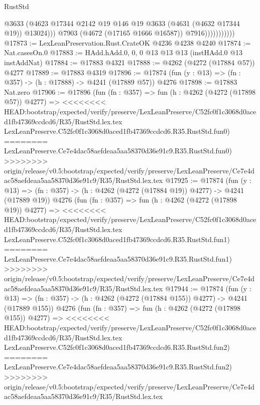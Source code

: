 \begin{lexlean}{RustStd}
\begin{coremodule}
{\begin{coremodule}
{{{{{{{{{{{{{{{{                              @3633
                              (@4623
                                @17344
                                @2142
                                @19
                                @146
                                @19
                                @3633
                                (@4631 (@4632 @17344 @19))
                                @13024)))
                          @7903
                          (@4672 (@17165 @1666 @16587))
                          @7916)))))))))))
@17873 := LexLeanPreservation.Rust.CrateOK @4236 @4238 @4240
@17874 := Nat.casesOn.{0}
@17883 := HAdd.hAdd.{0, 0, 0} @13 @13 @13 (instHAdd.{0} @13 instAddNat)
@17884 := @17883 @4321
@17888 := @4262 (@4272 (@17884 @57)) @4277
@17889 := @17883 @4319
@17896 := @17874 (fun (y : @13) => (fn : @357) -> (h : @17888) -> @4241 (@17889 @57)) @4276
@17898 := @17883 Nat.zero
@17906 := @17896
    (fun (fn : @357) =>
    fun (h : @4262 (@4272 (@17898 @57)) @4277) =>
<<<<<<<< HEAD:bootstrap/expected/verify/preserve/LexLeanPreserve/C52fc0f1c3068d0aced1fb47369ccdcd6/R35/RustStd.lex.tex
    LexLeanPreserve.C52fc0f1c3068d0aced1fb47369ccdcd6.R35.RustStd.fun0)
========
    LexLeanPreserve.Ce7e4dac58aefdeaa5aa58370d36e91c9.R35.RustStd.fun0)
>>>>>>>> origin/release/v0.5:bootstrap/expected/verify/preserve/LexLeanPreserve/Ce7e4dac58aefdeaa5aa58370d36e91c9/R35/RustStd.lex.tex
@17925 := @17874
    (fun (y : @13) => (fn : @357) -> (h : @4262 (@4272 (@17884 @19)) @4277) -> @4241 (@17889 @19))
    @4276
    (fun (fn : @357) =>
    fun (h : @4262 (@4272 (@17898 @19)) @4277) =>
<<<<<<<< HEAD:bootstrap/expected/verify/preserve/LexLeanPreserve/C52fc0f1c3068d0aced1fb47369ccdcd6/R35/RustStd.lex.tex
    LexLeanPreserve.C52fc0f1c3068d0aced1fb47369ccdcd6.R35.RustStd.fun1)
========
    LexLeanPreserve.Ce7e4dac58aefdeaa5aa58370d36e91c9.R35.RustStd.fun1)
>>>>>>>> origin/release/v0.5:bootstrap/expected/verify/preserve/LexLeanPreserve/Ce7e4dac58aefdeaa5aa58370d36e91c9/R35/RustStd.lex.tex
@17944 := @17874
    (fun (y : @13) => (fn : @357) -> (h : @4262 (@4272 (@17884 @155)) @4277) -> @4241 (@17889 @155))
    @4276
    (fun (fn : @357) =>
    fun (h : @4262 (@4272 (@17898 @155)) @4277) =>
<<<<<<<< HEAD:bootstrap/expected/verify/preserve/LexLeanPreserve/C52fc0f1c3068d0aced1fb47369ccdcd6/R35/RustStd.lex.tex
    LexLeanPreserve.C52fc0f1c3068d0aced1fb47369ccdcd6.R35.RustStd.fun2)
========
    LexLeanPreserve.Ce7e4dac58aefdeaa5aa58370d36e91c9.R35.RustStd.fun2)
>>>>>>>> origin/release/v0.5:bootstrap/expected/verify/preserve/LexLeanPreserve/Ce7e4dac58aefdeaa5aa58370d36e91c9/R35/RustStd.lex.tex
}}}}}}}}}}}}}}}}
\end{coremodule}}
\end{coremodule}
\end{lexlean}
